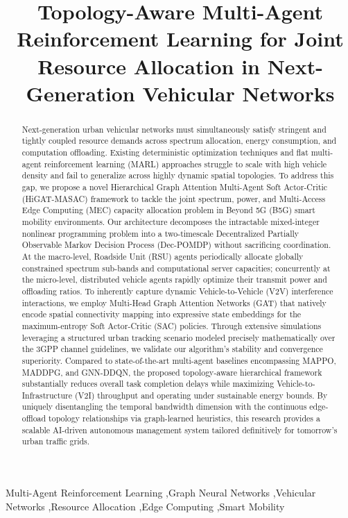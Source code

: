 \title{Topology-Aware Multi-Agent Reinforcement Learning for Joint Resource Allocation in Next-Generation Vehicular Networks}

\begin{abstract}
Next-generation urban vehicular networks must simultaneously satisfy stringent and tightly coupled resource demands across spectrum allocation, energy consumption, and computation offloading. Existing deterministic optimization techniques and flat multi-agent reinforcement learning (MARL) approaches struggle to scale with high vehicle density and fail to generalize across highly dynamic spatial topologies. To address this gap, we propose a novel Hierarchical Graph Attention Multi-Agent Soft Actor-Critic (HiGAT-MASAC) framework to tackle the joint spectrum, power, and Multi-Access Edge Computing (MEC) capacity allocation problem in Beyond 5G (B5G) smart mobility environments. Our architecture decomposes the intractable mixed-integer nonlinear programming problem into a two-timescale Decentralized Partially Observable Markov Decision Process (Dec-POMDP) without sacrificing coordination. At the macro-level, Roadside Unit (RSU) agents periodically allocate globally constrained spectrum sub-bands and computational server capacities; concurrently at the micro-level, distributed vehicle agents rapidly optimize their transmit power and offloading ratios. To inherently capture dynamic Vehicle-to-Vehicle (V2V) interference interactions, we employ Multi-Head Graph Attention Networks (GAT) that natively encode spatial connectivity mapping into expressive state embeddings for the maximum-entropy Soft Actor-Critic (SAC) policies. Through extensive simulations leveraging a structured urban tracking scenario modeled precisely mathematically over the 3GPP channel guidelines, we validate our algorithm’s stability and convergence superiority. Compared to state-of-the-art multi-agent baselines encompassing MAPPO, MADDPG, and GNN-DDQN, the proposed topology-aware hierarchical framework substantially reduces overall task completion delays while maximizing Vehicle-to-Infrastructure (V2I) throughput and operating under sustainable energy bounds. By uniquely disentangling the temporal bandwidth dimension with the continuous edge-offload topology relationships via graph-learned heuristics, this research provides a scalable AI-driven autonomous management system tailored definitively for tomorrow’s urban traffic grids.
\end{abstract}

\begin{keyword}
Multi-Agent Reinforcement Learning \sep Graph Neural Networks \sep Vehicular Networks \sep Resource Allocation \sep Edge Computing \sep Smart Mobility
\end{keyword}
